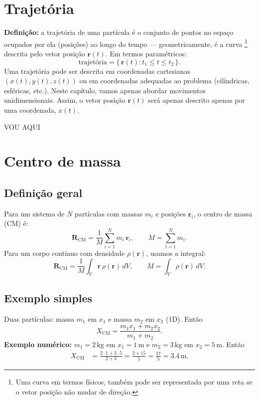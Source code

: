 \documentclass[a4paper,12pt]{article}
\begin{document}
	\section{Trajetória}
	\textbf{Definição:} a trajetória de uma partícula é o conjunto de pontos no espaço ocupados por ela (posições) ao longo do tempo — geometricamente, é a curva \footnote{Uma curva em termos físicos, também pode ser representada por uma reta se o vetor posição não mudar de direção.} descrita pelo vetor posição $\mathbf{r}(t)$. Em termos paramétricos:
	\[ \text{trajetória} = \{\,\mathbf{r}(t) : t_1\le t \le t_2\,\}. \]
	Uma trajetória pode ser descrita em coordenadas cartesianas $(x(t),y(t),z(t))$ ou em coordenadas adequadas ao problema (cilíndricas, esféricas, etc.).
	Neste capítulo, vamos apenas abordar movimentos unidimensionais. Assim, o vetor posição $\mathbf{r}(t)$ será apenas descrito apenas por uma coordenada, $x(t)$.
	
	
	VOU AQUI
	
	
	
	\section{Centro de massa}
	\subsection{Definição geral}
	Para um sistema de $N$ partículas com massas $m_i$ e posições $\mathbf{r}_i$, o centro de massa (CM) é:
	\begin{equation}\label{eq:CM_discrete}
		\mathbf{R}_{\mathrm{CM}} = \frac{1}{M} \sum_{i=1}^N m_i\,\mathbf{r}_i,\qquad M=\sum_{i=1}^N m_i.
	\end{equation}
	Para um corpo contínuo com densidade $\rho(\mathbf{r})$, usamos a integral:
	\begin{equation}\label{eq:CM_cont}
		\mathbf{R}_{\mathrm{CM}} = \frac{1}{M}\int_{V} \mathbf{r}\,\rho(\mathbf{r})\,dV,\qquad M=\int_{V}\rho(\mathbf{r})\,dV.
	\end{equation}
	
	\subsection{Exemplo simples}
	Duas partículas: massa $m_1$ em $x_1$ e massa $m_2$ em $x_2$ (1D). Então
	\[ X_{\mathrm{CM}} = \frac{m_1 x_1 + m_2 x_2}{m_1+m_2}. \]
	\textbf{Exemplo numérico:} $m_1=2\,\mathrm{kg}$ em $x_1=1\,\mathrm{m}$ e $m_2=3\,\mathrm{kg}$ em $x_2=5\,\mathrm{m}$. Então
	\begin{align*}
		X_{\mathrm{CM}} &= \frac{2\cdot 1 + 3\cdot 5}{2+3} = \frac{2+15}{5} = \frac{17}{5} = 3.4\,\mathrm{m}.
	\end{align*}
	
\end{document}
